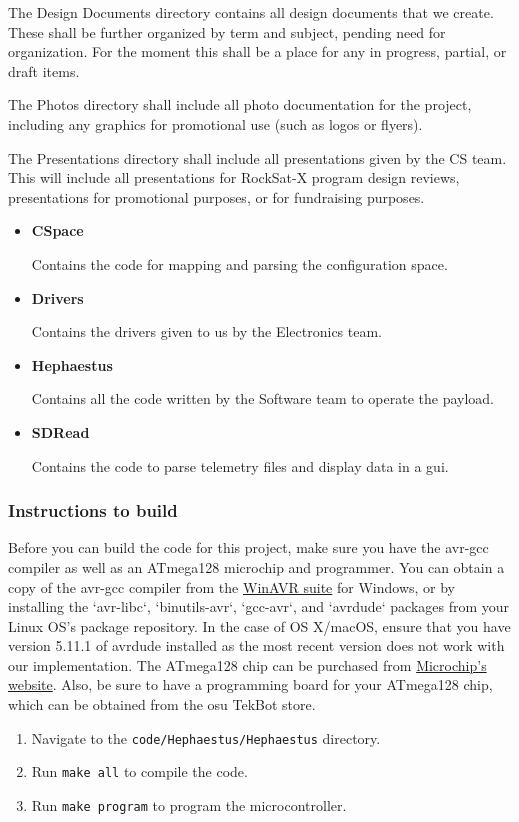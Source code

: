 The Design Documents directory contains all design documents that we create. These shall be further organized by term and subject, pending need for organization. For the moment this shall be a place for any in progress, partial, or draft items.

The Photos directory shall include all photo documentation for the project, including any graphics for promotional use (such as logos or flyers).

The Presentations directory shall include all presentations given by the CS team. This will include all presentations for RockSat-X program design reviews, presentations for promotional purposes, or for fundraising purposes.

\begin{itemize}
	\item \textbf{CSpace}

	Contains the code for mapping and parsing the configuration space.

	\item \textbf{Drivers}

	Contains the drivers given to us by the Electronics team.

	\item \textbf{Hephaestus}

	Contains all the code written by the Software team to operate the \gls{payload}.

	\item \textbf{SDRead}

	Contains the code to parse telemetry files and display data in a \gls{gui}.
\end{itemize}

\subsubsection{Instructions to build}

Before you can build the code for this project, make sure you have the avr-gcc 
compiler as well as an ATmega128 microchip and programmer. You can obtain a 
copy of the avr-gcc compiler from the 
\href{http://winavr.sourceforge.net/}{WinAVR suite} for Windows, or by 
installing the `avr-libc`, `binutils-avr`, `gcc-avr`, and `avrdude` packages 
from your Linux OS's package repository. In the case of OS X/macOS, ensure that 
you have version 5.11.1 of avrdude installed as the most recent version does 
not work with our implementation. The ATmega128 chip can be purchased from 
\href{https://www.microchip.com/wwwproducts/en/ATMEGA128}{Microchip's website}.
Also, be sure to have a programming board for your ATmega128 chip, which can be 
obtained from the \gls{osu} TekBot store.

\begin{enumerate}
	\item{Navigate to the \texttt{code/Hephaestus/Hephaestus} directory.}
	\item{Run \texttt{make all} to compile the code.}
	\item{Run \texttt{make program} to program the microcontroller.}
\end{enumerate}